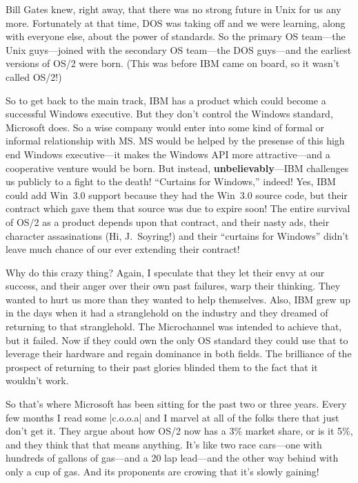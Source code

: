 Bill Gates knew, right away, that there was no
strong future in Unix for us any more.  Fortunately at that time, DOS
was taking off and we were learning, along with everyone else, about
the power of standards.  So the primary OS team---the Unix guys---joined
with the secondary OS team---the DOS guys---and the earliest versions
of OS/2 were born.  (This was before IBM came on board, so it wasn't called 
OS/2!)

So to get back to the main track, IBM has a product which could
become a successful Windows executive.  But they don't control the
Windows standard, Microsoft does.  So a wise company would enter into
some kind of formal or informal relationship with MS\hbox{}.  MS would be
helped by the presense of this high end Windows executive---it makes
the Windows API more attractive---and a cooperative venture would be
born.  But instead, {\bf unbelievably}---IBM challenges us publicly
to a fight to the death!  ``Curtains for Windows,'' indeed!  Yes,
IBM could add Win~3.0 support because they had the Win~3.0 source
code, but their contract which gave them that source was due to expire
soon!  The entire survival of OS/2 as a product depends upon that
contract, and their nasty ads, their character assasinations (Hi,
J.~Soyring!)  and their ``curtains for Windows'' didn't leave much
chance of our ever extending their contract!

Why do this crazy thing?  Again, I speculate that they let their envy
at our success, and their anger over their own past failures, warp their
thinking.  They wanted to hurt us more than they wanted to help themselves.
Also, IBM grew up in the days when it had a stranglehold on the industry
and they dreamed of returning to that stranglehold.  The Microchannel
was intended to achieve that, but it failed.  Now if they could own the
only OS standard they could use that to leverage their hardware and
regain dominance in both fields.  The brilliance of the prospect of
returning to their past glories blinded them to the fact that it wouldn't
work.

So that's where Microsoft has been sitting for the past two or three
years.  Every few months I read some |c.o.o.a| and I marvel at all of
the folks there that just don't get it.  They argue about how OS/2 now has
a 3\% market share, or is it 5\%, and they think that that means anything.
It's like two race cars---one with hundreds of gallons of gas---and
a 20 lap lead---and the other way behind with only a cup of gas.  And
its proponents are crowing that it's slowly gaining!


